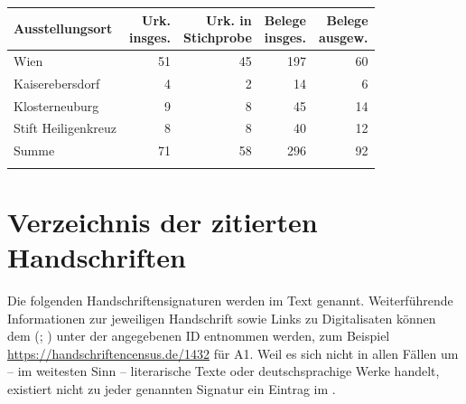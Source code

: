 \begin{tabularx}{\linewidth}{X r r r r}
\lsptoprule
Ausstellungsort
	& \makecell{Urk.\\ insges.}
	& \makecell{Urk. in\\ Stichprobe}
	& \makecell{Belege\\ insges.}
	& \makecell{Belege\\ ausgew.}
	\\
\midrule

Wien
	& 51
	& 45
	& 197
	& 60
	\\

Kaiserebersdorf
	& 4
	& 2
	& 14
	& 6
	\\

Klosterneuburg
	& 9
	& 8
	& 45
	& 14
	\\

Stift Heiligenkreuz
	& 8
	& 8
	& 40
	& 12
	\\

\midrule

Summe
	& 71
	& 58
	& 296
	& 92
	\\

\lspbottomrule
\end{tabularx}


\chapter{Verzeichnis der zitierten Handschriften}
\label{ch:hssverz}

Die folgenden Handschriftensignaturen werden im Text genannt. Weiterführende
Informationen zur jeweiligen Handschrift sowie Links zu Digitalisaten können
dem  (; \nosh\cite{hsc}) unter der
angegebenen ID entnommen werden, zum Beispiel
\url{https://handschriftencensus.de/1432} für A1. Weil es sich nicht in allen
Fällen um -- im weitesten Sinn -- literarische Texte oder deutsch\-sprachige
Werke handelt, existiert nicht zu jeder genannten Signatur ein Eintrag im
.\\

